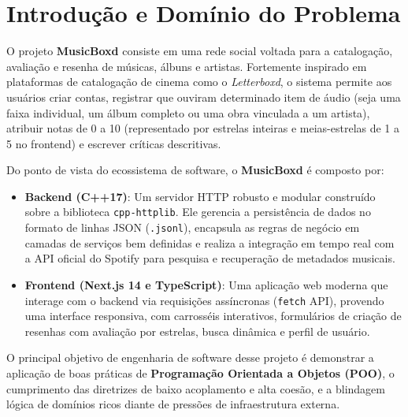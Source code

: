 \documentclass[12pt,a4paper]{article}
\begin{document}
\newpage
\tableofcontents
\newpage

\section{Introdução e Domínio do Problema}
O projeto \textbf{MusicBoxd} consiste em uma rede social voltada para a catalogação, avaliação e resenha de músicas, álbuns e artistas. Fortemente inspirado em plataformas de catalogação de cinema como o \textit{Letterboxd}, o sistema permite aos usuários criar contas, registrar que ouviram determinado item de áudio (seja uma faixa individual, um álbum completo ou uma obra vinculada a um artista), atribuir notas de 0 a 10 (representado por estrelas inteiras e meias-estrelas de 1 a 5 no frontend) e escrever críticas descritivas.

Do ponto de vista do ecossistema de software, o \textbf{MusicBoxd} é composto por:
\begin{itemize}
    \item \textbf{Backend (C++17)}: Um servidor HTTP robusto e modular construído sobre a biblioteca \texttt{cpp-httplib}. Ele gerencia a persistência de dados no formato de linhas JSON (\texttt{.jsonl}), encapsula as regras de negócio em camadas de serviços bem definidas e realiza a integração em tempo real com a API oficial do Spotify para pesquisa e recuperação de metadados musicais.
    \item \textbf{Frontend (Next.js 14 e TypeScript)}: Uma aplicação web moderna que interage com o backend via requisições assíncronas (\texttt{fetch} API), provendo uma interface responsiva, com carrosséis interativos, formulários de criação de resenhas com avaliação por estrelas, busca dinâmica e perfil de usuário.
\end{itemize}

O principal objetivo de engenharia de software desse projeto é demonstrar a aplicação de boas práticas de \textbf{Programação Orientada a Objetos (POO)}, o cumprimento das diretrizes de baixo acoplamento e alta coesão, e a blindagem lógica de domínios ricos diante de pressões de infraestrutura externa.
\end{document}
